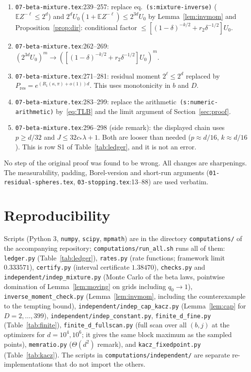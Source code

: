 \documentclass[11pt]{article}
\theoremstyle{definition}
\theoremstyle{remark}
\newcommand{\E}{\mathbb E}
\newcommand{\Ores}{P_{\mathrm{res}}}
\begin{document}
\begin{enumerate}[label=C\arabic*.,leftmargin=2.2em]
\item \texttt{07-beta-mixture.tex}:239--257: replace eq.~\texttt{(s:mixture-inverse)} (\(\E Z^{-\ell}\le2^d\)) and
\(2^dU_0(1+\E Z^{-\ell})\le2^{3d}U_0\) by Lemma~\ref{lem:invmom} and Proposition~\ref{prop:dir}:
conditional factor \(\le[(1-\delta)^{-k/2}+r_2\delta^{-1/2}]U_0\).
\item \texttt{07-beta-mixture.tex}:262--269: \((2^{3d}U_0)^m\to([(1-\delta)^{-k/2}+r_2\delta^{-1/2}]U_0)^m\).
\item \texttt{07-beta-mixture.tex}:271--281: residual moment \(2^\ell\le2^d\) replaced by \(\Ores=e^{(R_1(\kappa,\pi)+o(1))d}\).
This uses monotonicity in \(b\) and \(D\).
\item \texttt{07-beta-mixture.tex}:283--299: replace the arithmetic~\texttt{(s:numeric-arithmetic)} by~\eqref{eq:TLB} and the
limit argument of Section~\ref{sec:proof}.
\item \texttt{07-beta-mixture.tex}:296--298 (side remark): the displayed chain uses \(p\ge d/32\) and \(J\le32c_*\lambda+1\). Both are
looser than needed (\(p\approx d/16\), \(k\approx d/16\)). This is row S1 of Table~\ref{tab:ledger}, and it is not an error.
\end{enumerate}
No step of the original proof was found to be wrong. All changes are sharpenings. The measurability, padding,
Borel-version and short-run arguments (\texttt{01-residual-spheres.tex}, \texttt{03-stopping.tex}:13--88) are used verbatim.

\section{Reproducibility}
Scripts (Python 3, \texttt{numpy}, \texttt{scipy}, \texttt{mpmath}) are in the directory \texttt{computations/} of the
accompanying repository; \texttt{computations/run\_all.sh} runs all of them:
\texttt{ledger.py} (Table~\ref{tab:ledger}),
\texttt{rates.py} (rate functions; framework limit~\(0.333571\)),
\texttt{certify.py} (interval certificate \(1.38470\)),
\texttt{checks.py} and \texttt{independent/indep\_mixture.py} (Monte Carlo of the beta laws, pointwise domination of
Lemma~\ref{lem:moving} on grids including \(q_0\to1\)),
\texttt{inverse\_moment\_check.py} (Lemma~\ref{lem:invmom}, including the counterexample to the tempting bound),
\texttt{independent/indep\_cap\_kacz.py} (Lemma~\ref{lem:cap} for \(D=2,\dots,399\)),
\texttt{independent/indep\_constant.py}, \texttt{finite\_d\_fine.py} (Table~\ref{tab:finite}),
\texttt{finite\_d\_fullscan.py} (full scan over all \((b,j)\) at the optimizers for \(d=10^4,10^6\); it gives the same block maximum as the sampled points),
\texttt{memratio.py} (\(\Theta(d^2)\) remark), and
\texttt{kacz\_fixedpoint.py} (Table~\ref{tab:kacz}).
The scripts in \texttt{computations/independent/} are separate re-implementations that do not import the others.
\end{document}
